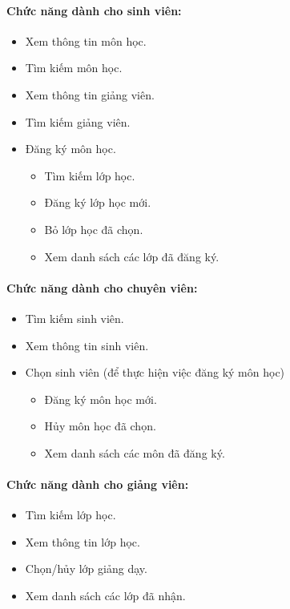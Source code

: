 \documentclass[12pt]{article}
\begin{document}
    \paragraph{Chức năng dành cho sinh viên:}
    \begin{itemize}
      \item Xem thông tin môn học.
      \item Tìm kiếm môn học.
      \item Xem thông tin giảng viên.
      \item Tìm kiếm giảng viên.
      \item Đăng ký môn học.
      \begin{itemize}
        \item Tìm kiếm lớp học.
        \item Đăng ký lớp học mới.
        \item Bỏ lớp học đã chọn.
        \item Xem danh sách các lớp đã đăng ký.
      \end{itemize}
    \end{itemize}

    \paragraph{Chức năng dành cho chuyên viên:}
    \begin{itemize}
      \item Tìm kiếm sinh viên.
      \item Xem thông tin sinh viên.
      \item Chọn sinh viên (để thực hiện việc đăng ký môn học)
      \begin{itemize}
        \item Đăng ký môn học mới.
        \item Hủy môn học đã chọn.
        \item Xem danh sách các môn đã đăng ký.
      \end{itemize}
    \end{itemize}

    \paragraph{Chức năng dành cho giảng viên:}
    \begin{itemize}
      \item Tìm kiếm lớp học.
      \item Xem thông tin lớp học.
      \item Chọn/hủy lớp giảng dạy.
      \item Xem danh sách các lớp đã nhận.
    \end{itemize}
\end{document}
